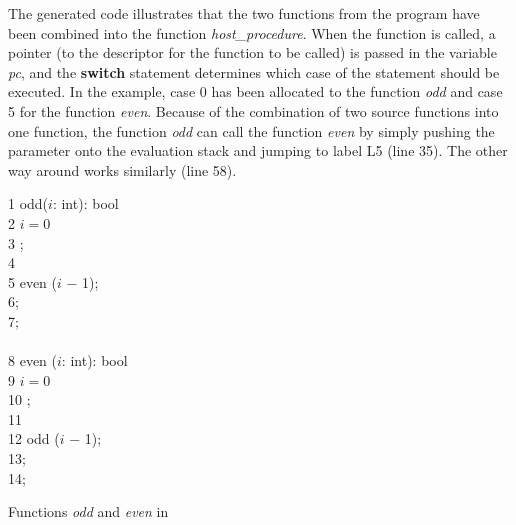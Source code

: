 The generated \cee{} code illustrates that the two functions from the
\turtle{} program have been combined into the function {\em
  host\_procedure}.  When the function is called, a pointer (to the
descriptor for the \turtle{} function to be called) is passed in the
variable {\em pc}, and the {\bf switch} statement determines which
case of the statement should be executed.  In the example, case 0 has
been allocated to the function {\em odd} and case 5 for the function
{\em even}.  Because of the combination of two source functions into
one \cee{} function, the function {\em odd} can call the function {\em
  even} by simply pushing the parameter onto the evaluation stack and
jumping to label L5 (line 35).  The other way around works similarly
(line 58).

\begin{Program}
\begin{ttlprog}
1\>\ttlFun{} odd($i$: int): bool\\
2\>\>\ttlIf{} $i = 0$ \ttlThen{}\\
3\>\>\>\ttlReturn{} \ttlFalse{};\\
4\>\>\ttlElse{}\\
5\>\>\>\ttlReturn{} even ($i$ $-$ 1);\\
6\>\>\ttlEnd{};\\
7\>\ttlEnd{};\\
\\
8\>\ttlFun{} even ($i$: int): bool\\
9\>\>\ttlIf{} $i = 0$ \ttlThen{}\\
10\>\>\>\ttlReturn{} \ttlTrue{};\\
11\>\>\ttlElse{}\\
12\>\>\>\ttlReturn{} odd ($i$ $-$ 1);\\
13\>\>\ttlEnd{};\\
14\>\ttlEnd{};
\end{ttlprog}
\caption{Functions {\em odd} and {\em even} in \turtle{}}
\label{prog:odd-even}

\end{Program}

